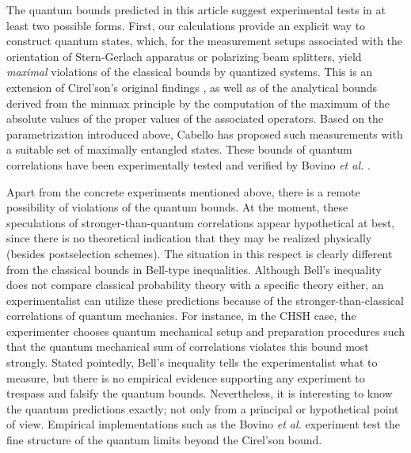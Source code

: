The quantum bounds predicted in this article
suggest experimental tests in at least two possible forms.
First, our calculations provide an explicit way to construct quantum states, which,
for the measurement setups associated with the orientation of Stern-Gerlach apparatus
or polarizing beam splitters,
yield {\em maximal} violations of the classical bounds by quantized systems.
This is an extension of Cirel'son's original findings \cite{cirelson:80,cirelson},
as well as of the analytical
bounds derived from the minmax principle \cite[\S 90]{halmos-vs} by the computation of the
maximum of the absolute values of the proper values of the associated operators.
Based on the parametrization introduced above, Cabello has proposed such measurements
\cite{cabello-2003a} with a suitable set of maximally entangled states.
These bounds of quantum correlations
have been experimentally tested and verified by Bovino {\it et al.}
\cite{bovino-2003}.

Apart from the concrete experiments mentioned above,
there is a remote possibility of violations of the quantum bounds.
At the moment, these speculations of stronger-than-quantum correlations
\cite{pop-rohr,mermin-1995,svozil-krenn} appear
hypothetical at best, since there is no theoretical indication
that they may be realized physically (besides postselection schemes).
The situation in this respect is clearly different
from the classical bounds in Bell-type inequalities.
Although Bell's inequality does not compare classical probability theory
with a specific theory either, an experimentalist
can utilize these predictions because of
the stronger-than-classical correlations of quantum mechanics.
For instance, in the CHSH case, the experimenter chooses
quantum mechanical setup and preparation procedures such that
the quantum mechanical sum of correlations  violates this bound
most strongly.  Stated pointedly,
Bell's inequality tells the experimentalist what to
measure, but there is no empirical evidence supporting
any experiment to trespass and falsify the quantum bounds.
Nevertheless, it is interesting to know the quantum predictions exactly;
not only from a principal or hypothetical point of view.
Empirical implementations such as the Bovino {\it et al.}
\cite{bovino-2003} experiment test the fine structure of the quantum limits
beyond the  Cirel'son bound.







%
%





